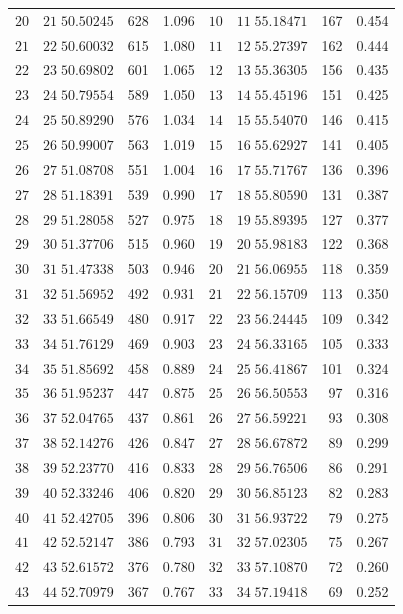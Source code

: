 \begin{center}
\begin{tabular}{|r|r|r|r||r|r|r|r|}
\(20\)&\(21\;50.50245\)&628&1.096&\(10\)&\(11\;55.18471\)&167&0.454\\
\(21\)&\(22\;50.60032\)&615&1.080&\(11\)&\(12\;55.27397\)&162&0.444\\
\(22\)&\(23\;50.69802\)&601&1.065&\(12\)&\(13\;55.36305\)&156&0.435\\
\(23\)&\(24\;50.79554\)&589&1.050&\(13\)&\(14\;55.45196\)&151&0.425\\
\(24\)&\(25\;50.89290\)&576&1.034&\(14\)&\(15\;55.54070\)&146&0.415\\
\(25\)&\(26\;50.99007\)&563&1.019&\(15\)&\(16\;55.62927\)&141&0.405\\
\(26\)&\(27\;51.08708\)&551&1.004&\(16\)&\(17\;55.71767\)&136&0.396\\
\(27\)&\(28\;51.18391\)&539&0.990&\(17\)&\(18\;55.80590\)&131&0.387\\
\(28\)&\(29\;51.28058\)&527&0.975&\(18\)&\(19\;55.89395\)&127&0.377\\
\(29\)&\(30\;51.37706\)&515&0.960&\(19\)&\(20\;55.98183\)&122&0.368\\[3pt]
\(30\)&\(31\;51.47338\)&503&0.946&\(20\)&\(21\;56.06955\)&118&0.359\\
\(31\)&\(32\;51.56952\)&492&0.931&\(21\)&\(22\;56.15709\)&113&0.350\\
\(32\)&\(33\;51.66549\)&480&0.917&\(22\)&\(23\;56.24445\)&109&0.342\\
\(33\)&\(34\;51.76129\)&469&0.903&\(23\)&\(24\;56.33165\)&105&0.333\\
\(34\)&\(35\;51.85692\)&458&0.889&\(24\)&\(25\;56.41867\)&101&0.324\\
\(35\)&\(36\;51.95237\)&447&0.875&\(25\)&\(26\;56.50553\)&97&0.316\\
\(36\)&\(37\;52.04765\)&437&0.861&\(26\)&\(27\;56.59221\)&93&0.308\\
\(37\)&\(38\;52.14276\)&426&0.847&\(27\)&\(28\;56.67872\)&89&0.299\\
\(38\)&\(39\;52.23770\)&416&0.833&\(28\)&\(29\;56.76506\)&86&0.291\\
\(39\)&\(40\;52.33246\)&406&0.820&\(29\)&\(30\;56.85123\)&82&0.283\\[3pt]
\(40\)&\(41\;52.42705\)&396&0.806&\(30\)&\(31\;56.93722\)&79&0.275\\
\(41\)&\(42\;52.52147\)&386&0.793&\(31\)&\(32\;57.02305\)&75&0.267\\
\(42\)&\(43\;52.61572\)&376&0.780&\(32\)&\(33\;57.10870\)&72&0.260\\
\(43\)&\(44\;52.70979\)&367&0.767&\(33\)&\(34\;57.19418\)&69&0.252\\

\end{tabular}
\end{center}
